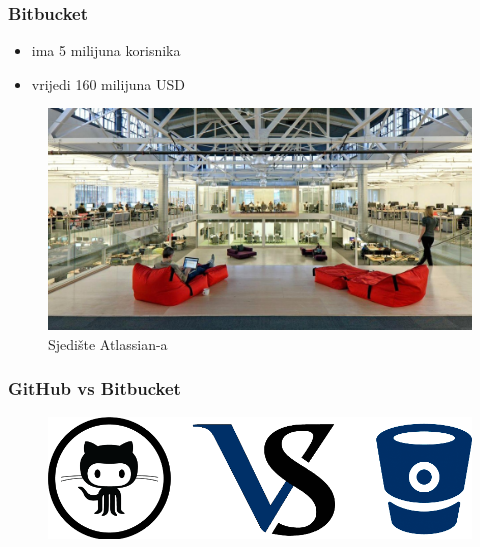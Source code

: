 \documentclass[12p, Times New Roman]{beamer}
\begin{document}
	\begin{frame}				%
		\frametitle{Bitbucket}
		\begin{itemize}
			\item ima 5 milijuna korisnika
			\item vrijedi 160 milijuna USD

		\end{itemize}

		\begin{figure}[h!]
			\begin{center}
				\includegraphics[scale=0.135]{headqbit.png}
				\caption{Sjedište Atlassian-a}
			\end{center}
		\end{figure}


	\end{frame}




	\begin{frame}    		    %
		\frametitle{GitHub vs Bitbucket}

		 \begin{figure}[h!]
			\begin{center}
				\includegraphics[scale=0.34]{GVB.png}
			\end{center}
		\end{figure}
 


	\end{frame}                             
\end{document}
